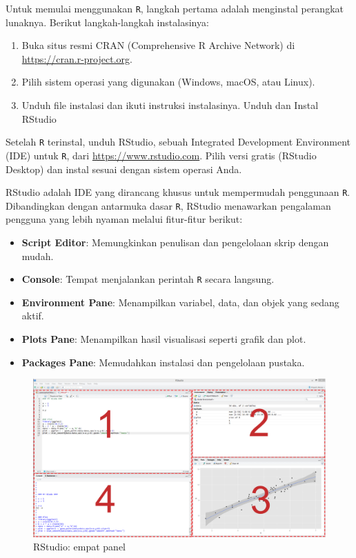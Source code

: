 \documentclass[
  oneside]{book}
\begin{document}
Untuk memulai menggunakan \texttt{R}, langkah pertama adalah
menginstal perangkat lunaknya. Berikut langkah-langkah instalasinya:

\begin{enumerate}
\def\labelenumi{\arabic{enumi}.}
\item
  Buka situs resmi CRAN (Comprehensive R Archive Network) di
  \url{https://cran.r-project.org}.
\item
  Pilih sistem operasi yang digunakan (Windows, macOS, atau Linux).
\item
  Unduh file instalasi dan ikuti instruksi instalasinya. Unduh dan
  Instal RStudio
\end{enumerate}

Setelah \texttt{R} terinstal, unduh RStudio, sebuah Integrated
Development Environment (IDE) untuk \texttt{R}, dari
\url{https://www.rstudio.com}. Pilih versi gratis (RStudio Desktop) dan
instal sesuai dengan sistem operasi Anda.

RStudio adalah IDE yang dirancang khusus untuk mempermudah penggunaan
\texttt{R}. Dibandingkan dengan antarmuka dasar \texttt{R},
RStudio menawarkan pengalaman pengguna yang lebih nyaman melalui
fitur-fitur berikut:

\begin{itemize}
\item
  \textbf{Script Editor}: Memungkinkan penulisan dan pengelolaan skrip
  dengan mudah.
\item
  \textbf{Console}: Tempat menjalankan perintah \texttt{R} secara
  langsung.
\item
  \textbf{Environment Pane}: Menampilkan variabel, data, dan objek yang
  sedang aktif.
\item
  \textbf{Plots Pane}: Menampilkan hasil visualisasi seperti grafik dan
  plot.
\item
  \textbf{Packages Pane}: Memudahkan instalasi dan pengelolaan pustaka.
\end{itemize}

\begin{figure}[h]

{\centering \includegraphics[width=0.8\linewidth]{images/rstudio} 

}

\caption{RStudio: empat panel}\label{fig:unnamed-chunk-6}
\end{figure}
\end{document}
